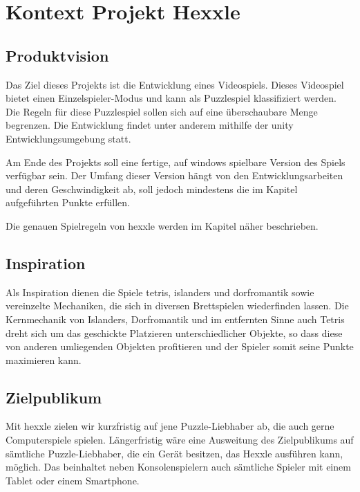 \documentclass[../main.tex]{subfiles}
\begin{document}
	\section{Kontext Projekt Hexxle}
	\label{section:Kontext}
	
	\subsection{Produktvision}
	\par Das Ziel dieses Projekts ist die Entwicklung eines Videospiels. Dieses Videospiel bietet einen Einzelspieler-Modus und kann als Puzzlespiel klassifiziert werden. Die Regeln für diese Puzzlespiel sollen sich auf eine überschaubare Menge begrenzen. Die Entwicklung findet unter anderem mithilfe der \gls{unity} Entwicklungsumgebung statt.
	\par Am Ende des Projekts soll eine fertige, auf \gls{windows} spielbare Version des Spiels verfügbar sein. Der Umfang dieser Version hängt von den Entwicklungsarbeiten und deren Geschwindigkeit ab, soll jedoch mindestens die im Kapitel  aufgeführten Punkte erfüllen.
	\par Die genauen Spielregeln von \gls{hexxle} werden im Kapitel  näher beschrieben.
	
	\subsection{Inspiration}
	\par Als Inspiration dienen die Spiele \gls{tetris}, \gls{islanders} und \gls{dorfromantik} sowie vereinzelte Mechaniken, die sich in diversen Brettspielen wiederfinden lassen. Die Kernmechanik von Islanders, Dorfromantik und im entfernten Sinne auch Tetris dreht sich um das geschickte Platzieren unterschiedlicher Objekte, so dass diese von anderen umliegenden Objekten profitieren und der Spieler somit seine Punkte maximieren kann.

	\subsection{Zielpublikum}
	\par Mit \gls{hexxle} zielen wir kurzfristig auf jene Puzzle-Liebhaber ab, die auch gerne Computerspiele spielen. Längerfristig wäre eine Ausweitung des Zielpublikums auf sämtliche Puzzle-Liebhaber, die ein Gerät besitzen, das Hexxle ausführen kann, möglich. Das beinhaltet neben Konsolenspielern auch sämtliche Spieler mit einem Tablet oder einem Smartphone.
\end{document}

